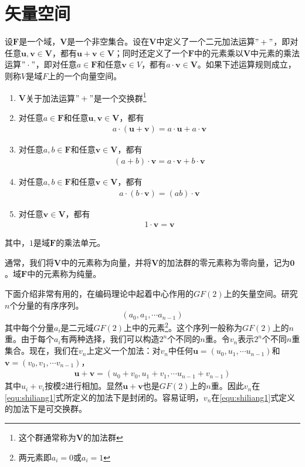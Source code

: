 \section{矢量空间\cite{Coding_Theory}}
\begin{ioadefine}
  设$\mathbf{F}$是一个域，$\mathbf{V}$是一个非空集合。设在$\mathbf{V}$中定义了一个二元加法运算$"+"$，即对任意$\mathbf{u,v}\in
  \mathbf{V}$，都有$\mathbf{u}+\mathbf{v}\in
  \mathbf{V}$；同时还定义了一个$\mathbf{F}$中的元素乘以$\mathbf{V}$中元素的乘法运算$"\cdot"$，即对任意$a\in
  \mathbf{F}$和任意$\mathbf{v}\in V$，都有$a\cdot\mathbf{v}\in
  \mathbf{V}$。如果下述运算规则成立，则称$V$是域$F$上的一个向量空间。
\begin{enumerate}
  \item
    $\mathbf{V}$关于加法运算$"+"$是一个交换群\footnote{这个群通常称为$\mathbf{V}$的加法群}
  \item 对任意$a\in \mathbf{F}$和任意$\mathbf{u,v}\in \mathbf{V}$，都有
    \begin{eqnarray}
      a\cdot(\mathbf{u}+\mathbf{v})=a\cdot\mathbf{u}+a\cdot\mathbf{v}
    \end{eqnarray}
  \item 对任意$a,b\in \mathbf{F}$和任意$\mathbf{v}\in \mathbf{V}
    $，都有
    \begin{eqnarray}
      (a+b)\cdot\mathbf{v}=a\cdot\mathbf{v}+b\cdot\mathbf{v}
    \end{eqnarray}
  \item 对任意$a,b\in \mathbf{F}$和任意$\mathbf{v}\in \mathbf{V}$，都有
    \begin{eqnarray}
      a\cdot(b\cdot\mathbf{v})=(ab)\cdot\mathbf{v}
    \end{eqnarray}
  \item 对任意$\mathbf{v}\in \mathbf{V}$，都有
    \begin{eqnarray}
      1\cdot\mathbf{v}=\mathbf{v}
    \end{eqnarray}
\end{enumerate}
其中，$1$是域$\mathbf{F}$的乘法单元。

通常，我们将$\mathbf{V}$中的元素称为向量，并将$\mathbf{V}$的加法群的零元素称为零向量，记为$\mathbf{0}$。域$\mathbf{F}$中的元素称为纯量。
\end{ioadefine}

下面介绍非常有用的，在编码理论中起着中心作用的$GF(2)$上的矢量空间。研究$n$个分量的有序序列。
\[
(a_0,a_1,\cdots a_{n-1})
\]
其中每个分量$a_i$是二元域$GF(2)$上中的元素\footnote{两元素即$a_i=0$或$a_i=1$}。这个序列一般称为$GF(2)$上的$n$重。由于每个$a_i$有两种选择，我们可以构造$2^n$个不同的$n$重。令$v_n$表示$2^n$个不同$n$重集合。现在，我们在$v_n$上定义一个加法：对$v_n$中任何$\mathbf{u}=(u_0,u_1,\cdots
u_{n-1})$和$\mathbf{v}=(v_0,v_1,\cdots v_{n-1})$，
\begin{eqnarray}
  \mathbf{u}+\mathbf{v}=(u_0+v_0,u_1+v_1,\cdots u_{n-1}+v_{n-1})
  \label{equ:shiliang1}
\end{eqnarray}
其中$u_i+v_i$按模2进行相加。显然$\mathbf{u}+\mathbf{v}$也是$GF(2)$上的$n$重。因此$v_n$在\ref{equ:shiliang1}式所定义的加法下是封闭的。容易证明，$v_n$在\ref{equ:shiliang1}式定义的加法下是可交换群。

